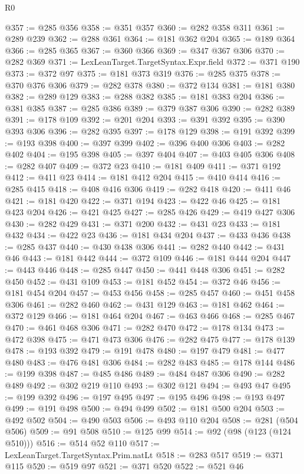 \begin{lexlean}{R0}
\begin{coremodule}
@357 := @285 @356
@358 := @351 @357
@360 := @282 @358 @311
@361 := @289 @239
@362 := @288 @361
@364 := @181 @362 @204
@365 := @189 @364
@366 := @285 @365
@367 := @360 @366
@369 := @347 @367 @306
@370 := @282 @369
@371 := LexLeanTarget.TargetSyntax.Expr.field
@372 := @371 @190
@373 := @372 @97
@375 := @181 @373 @319
@376 := @285 @375
@378 := @370 @376 @306
@379 := @282 @378
@380 := @372 @134
@381 := @181 @380
@382 := @289 @129
@383 := @288 @382
@385 := @181 @383 @204
@386 := @381 @385
@387 := @285 @386
@389 := @379 @387 @306
@390 := @282 @389
@391 := @178 @109
@392 := @201 @204
@393 := @391 @392
@395 := @390 @393 @306
@396 := @282 @395
@397 := @178 @129
@398 := @191 @392
@399 := @193 @398
@400 := @397 @399
@402 := @396 @400 @306
@403 := @282 @402
@404 := @195 @398
@405 := @397 @404
@407 := @403 @405 @306
@408 := @282 @407
@409 := @372 @23
@410 := @181 @409
@411 := @371 @192
@412 := @411 @23
@414 := @181 @412 @204
@415 := @410 @414
@416 := @285 @415
@418 := @408 @416 @306
@419 := @282 @418
@420 := @411 @46
@421 := @181 @420
@422 := @371 @194
@423 := @422 @46
@425 := @181 @423 @204
@426 := @421 @425
@427 := @285 @426
@429 := @419 @427 @306
@430 := @282 @429
@431 := @371 @200
@432 := @431 @23
@433 := @181 @432
@434 := @422 @23
@436 := @181 @434 @204
@437 := @433 @436
@438 := @285 @437
@440 := @430 @438 @306
@441 := @282 @440
@442 := @431 @46
@443 := @181 @442
@444 := @372 @109
@446 := @181 @444 @204
@447 := @443 @446
@448 := @285 @447
@450 := @441 @448 @306
@451 := @282 @450
@452 := @431 @109
@453 := @181 @452
@454 := @372 @46
@456 := @181 @454 @204
@457 := @453 @456
@458 := @285 @457
@460 := @451 @458 @306
@461 := @282 @460
@462 := @431 @129
@463 := @181 @462
@464 := @372 @129
@466 := @181 @464 @204
@467 := @463 @466
@468 := @285 @467
@470 := @461 @468 @306
@471 := @282 @470
@472 := @178 @134
@473 := @472 @398
@475 := @471 @473 @306
@476 := @282 @475
@477 := @178 @139
@478 := @193 @392
@479 := @191 @478
@480 := @197 @479
@481 := @477 @480
@483 := @476 @481 @306
@484 := @282 @483
@485 := @178 @144
@486 := @199 @398
@487 := @485 @486
@489 := @484 @487 @306
@490 := @282 @489
@492 := @302 @219 @110
@493 := @302 @121
@494 := @493 @47
@495 := @199 @392
@496 := @197 @495
@497 := @195 @496
@498 := @193 @497
@499 := @191 @498
@500 := @494 @499
@502 := @181 @500 @204
@503 := @492 @502
@504 := @490 @503
@506 := @493 @110 @204
@508 := @281 (@504 @506)
@509 := @91 @508
@510 := @125 @99
@514 := @92 (@98 (@123 (@124 @510)))
@516 := @514 @52 @110
@517 := LexLeanTarget.TargetSyntax.Prim.natLt
@518 := @283 @517
@519 := @371 @115
@520 := @519 @97
@521 := @371 @520
@522 := @521 @46

\end{coremodule}
\end{lexlean}

